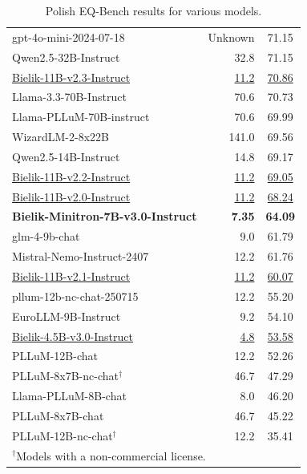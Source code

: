 \documentclass{article}
\begin{document}
\begin{table}[t]
\begin{tabular}{lrc}
    gpt-4o-mini-2024-07-18 & Unknown & 71.15 \\
    Qwen2.5-32B-Instruct & 32.8 & 71.15 \\
    \underline{Bielik-11B-v2.3-Instruct} & \underline{11.2} & \underline{70.86} \\
    Llama-3.3-70B-Instruct & 70.6 & 70.73 \\
    Llama-PLLuM-70B-instruct & 70.6 & 69.99 \\
    WizardLM-2-8x22B & 141.0 & 69.56 \\
    Qwen2.5-14B-Instruct & 14.8 & 69.17 \\
    \underline{Bielik-11B-v2.2-Instruct} & \underline{11.2} & \underline{69.05} \\
    \underline{Bielik-11B-v2.0-Instruct} & \underline{11.2} & \underline{68.24} \\
    \textbf{Bielik-Minitron-7B-v3.0-Instruct} & \textbf{7.35} & \textbf{64.09} \\
    glm-4-9b-chat & 9.0 & 61.79 \\
    Mistral-Nemo-Instruct-2407 & 12.2 & 61.76 \\
    \underline{Bielik-11B-v2.1-Instruct} & \underline{11.2} & \underline{60.07} \\
    pllum-12b-nc-chat-250715 & 12.2 & 55.20 \\
    EuroLLM-9B-Instruct & 9.2 & 54.10 \\
    \underline{Bielik-4.5B-v3.0-Instruct} & \underline{4.8} & \underline{53.58} \\
    PLLuM-12B-chat & 12.2 & 52.26 \\
    PLLuM-8x7B-nc-chat$^{\dagger}$ & 46.7 & 47.29 \\
    Llama-PLLuM-8B-chat & 8.0 & 46.20 \\
    PLLuM-8x7B-chat & 46.7 & 45.22 \\
    PLLuM-12B-nc-chat$^{\dagger}$ & 12.2 & 35.41 \\
    \bottomrule
    \multicolumn{3}{l}{$^{\dagger}$Models with a non-commercial license.} \\
    \end{tabular}
    \caption{Polish EQ-Bench results for various models.}
    \label{tab:pl-eq-bench}
    \end{table}
\end{document}
